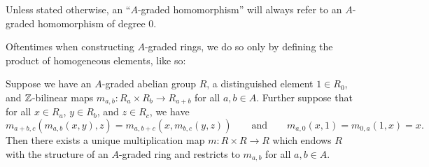 \documentclass[../main.tex]{subfiles}
\begin{document}
Unless stated otherwise, an ``$A$-graded homomorphism'' will always refer to an $A$-graded homomorphism of degree $0$. 


Oftentimes when constructing $A$-graded rings, we do so only by defining the product of homogeneous elements, like so:

\begin{lemma}\label{A_graded_ring}
	Suppose we have an $A$-graded abelian group $R$, a distinguished element $1\in R_0$, and $\mathbb{Z}$-bilinear maps $m_{a,b}:R_a\times R_b\to R_{a+b}$ for all $a,b\in A$. Further suppose that for all $x\in R_a$, $y\in R_b$, and $z\in R_c$, we have
	\[m_{a+b,c}(m_{a,b}(x,y),z)=m_{a,b+c}(x,m_{b,c}(y,z))\qquad\text{and}\qquad m_{a,0}(x,1)=m_{0,a}(1,x)=x.\]
	Then there exists a unique multiplication map $m:R\times R\to R$ which endows $R$ with the structure of an $A$-graded ring and restricts to $m_{a,b}$ for all $a,b\in A$.
\end{lemma}
\end{document}

